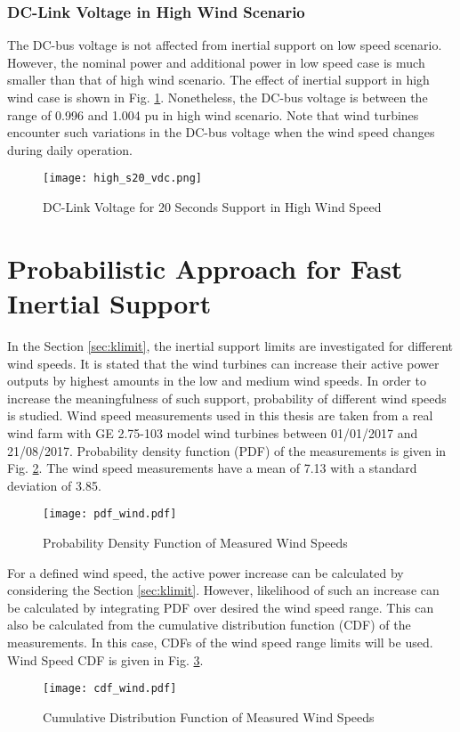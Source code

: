 \subsubsection{DC-Link Voltage in High Wind Scenario}
The DC-bus voltage is not affected from inertial support on low speed scenario. However, the nominal power and additional power in low speed case is much smaller than that of high wind scenario. The effect of inertial support in high wind case is shown in Fig. \ref{high_s20_vdc}. Nonetheless, the DC-bus voltage is between the range of 0.996 and 1.004 pu in high wind scenario. Note that wind turbines encounter such variations in the DC-bus voltage when the wind speed changes during daily operation. 
\begin{figure}[h!]
	\centering
	\texttt{[image: high\_s20\_vdc.png]}
	\caption{DC-Link Voltage for 20 Seconds Support in High Wind Speed}
	\label{high_s20_vdc}
\end{figure}
\section{Probabilistic Approach for Fast Inertial Support}
In the Section \ref{sec:klimit}, the inertial support limits are investigated for different wind speeds. It is stated that the wind turbines can increase their active power outputs by highest amounts in the low and medium wind speeds. In order to increase the meaningfulness of such support, probability of different wind speeds is studied. Wind speed measurements used in this thesis are taken from a real wind farm with GE 2.75-103 model wind turbines between 01/01/2017 and 21/08/2017. Probability density function (PDF) of the measurements is given in Fig. \ref{windpdf}. The wind speed measurements have a mean of 7.13 with a standard deviation of 3.85.\par
\begin{figure}[h!]
	\centering
	\texttt{[image: pdf\_wind.pdf]}
	\caption{Probability Density Function of Measured Wind Speeds}
	\label{windpdf}
\end{figure}
For a defined wind speed, the active power increase can be calculated by considering the Section \ref{sec:klimit}. However, likelihood of such an increase can be calculated by integrating PDF over desired the wind speed range. This can also be calculated from the cumulative distribution function (CDF) of the measurements. In this case, CDFs of the wind speed range limits will be used. Wind Speed CDF is given in Fig. \ref{windcdf}.
\begin{figure}[h!]
	\centering
	\texttt{[image: cdf\_wind.pdf]}
	\caption{Cumulative Distribution Function of Measured Wind Speeds}
	\label{windcdf}
\end{figure}
